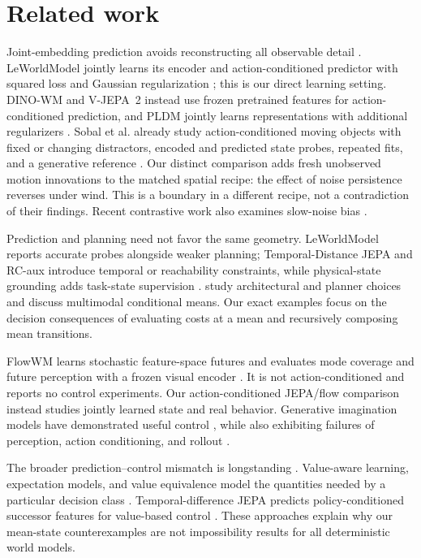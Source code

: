 \section{Related work}
\label{sec:related}

Joint-embedding prediction avoids reconstructing all observable detail
\citep{assran2023ijepa,bardes2024vjepa}. LeWorldModel jointly learns its encoder and action-conditioned
predictor with squared loss and Gaussian regularization \citep{maes2026lewm,balestriero2025lejepa};
this is our direct learning setting. DINO-WM and V-JEPA~2 instead use frozen pretrained features for
action-conditioned prediction, and PLDM jointly learns representations with additional regularizers
\citep{zhou2024dinowm,assran2025vjepa2,sobal2025pldm}. Sobal et al. already study action-conditioned moving objects with fixed or changing distractors,
encoded and predicted state probes, repeated fits, and a generative reference \citep{sobal2022slow}.
Our distinct comparison adds fresh unobserved motion innovations to the matched spatial recipe:
the effect of noise persistence reverses under wind. This is a boundary in a different recipe,
not a contradiction of their findings. Recent contrastive work also examines slow-noise bias
\citep{gulati2026contrast}.

Prediction and planning need not favor the same geometry. LeWorldModel reports accurate probes
alongside weaker planning; Temporal-Distance JEPA and RC-aux introduce temporal or reachability
constraints, while physical-state grounding adds task-state supervision
\citep{maes2026lewm,bai2026temporal,li2026rcaux,yan2026psgjepa,liu2026physicallygrounded}.
\citet{terver2026planning} study architectural and planner choices and discuss multimodal
conditional means. Our exact examples focus on the decision consequences of evaluating costs at a
mean and recursively composing mean transitions.

FlowWM learns stochastic feature-space futures and evaluates mode coverage and future perception
with a frozen visual encoder \citep{porcher2026flowwm}. It is not action-conditioned and reports no
control experiments. Our action-conditioned JEPA/flow comparison instead studies jointly learned
state and real behavior. Generative imagination models have demonstrated useful control
\citep{hafner2020dreamer,alonso2024diamond,hafner2025dreamer4}, while also exhibiting failures of
perception, action conditioning, and rollout \citep{hansen2026hallucination}.

The broader prediction--control mismatch is longstanding \citep{lambert2020objective}.
Value-aware learning, expectation models, and value equivalence model the quantities needed by a
particular decision class \citep{farahmand2017vaml,wan2019expectation,grimm2020value,grimm2021proper}.
Temporal-difference JEPA predicts policy-conditioned successor features for value-based control
\citep{bagatella2026tdjepa}. These approaches explain why our mean-state counterexamples are not
impossibility results for all deterministic world models.
